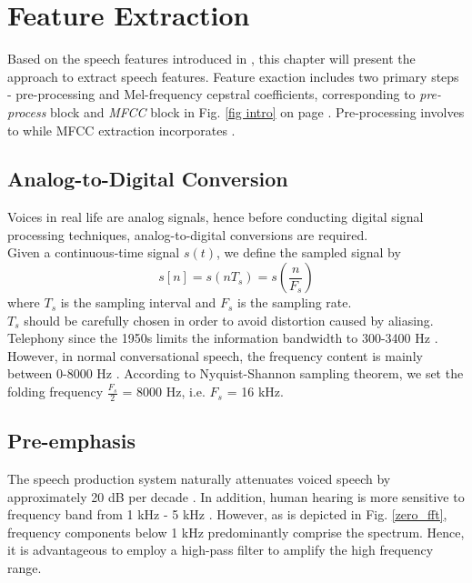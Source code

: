 \newpage
\chapter{Feature Extraction}
\label{chapter:speech-processing}

Based on the speech features introduced in , this chapter will present the approach to extract speech features. Feature exaction includes two primary steps - pre-processing and Mel-frequency cepstral coefficients, corresponding to \textit{pre-process} block and \textit{MFCC} block in Fig. \ref{fig intro} on page \pageref{fig intro}. Pre-processing involves  to  while MFCC extraction incorporates .

\section{Analog-to-Digital Conversion}
\label{section:pre-processing-first}
Voices in real life are analog signals, hence before conducting digital signal processing techniques, analog-to-digital conversions are required.\\

Given a continuous-time signal $s(t)$, we define the sampled signal by
\begin{equation}
s[n] = s(nT_s) = s(\frac{n}{F_s})
\end{equation}
where $T_s$ is the sampling interval and $F_s$ is the sampling rate.\\

$T_s$ should be carefully chosen in order to avoid distortion caused by aliasing. Telephony since the 1950s limits the information bandwidth to 300-3400 Hz \cite{EVW-report}. However, in normal conversational speech, the frequency content is mainly between 0-8000 Hz \cite{uysal2005bandwidth}. According to Nyquist-Shannon sampling theorem, we set the folding frequency $\frac{F_s}{2}$ = 8000 Hz, i.e. $F_s$ = 16 kHz.


\section{Pre-emphasis}

The speech production system naturally attenuates voiced speech by approximately 20 dB per decade \cite{picone1993signal}. In addition, human hearing is more sensitive to frequency band from 1 kHz - 5 kHz \cite{picone1993signal}. However, as is depicted in Fig. \ref{zero_fft}, frequency components below 1 kHz predominantly comprise the spectrum. Hence, it is advantageous to employ a high-pass filter to amplify the high frequency range.\\

